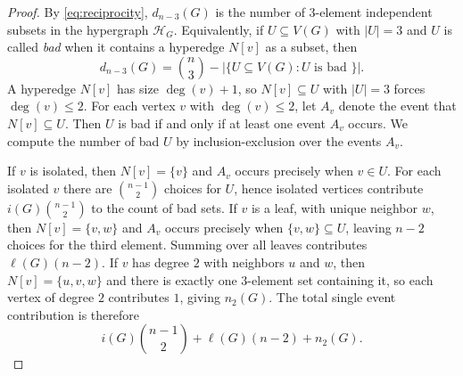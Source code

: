 \documentclass[11pt]{amsart}
\numberwithin{equation}{section}
\newcommand{\VV}{V(G)}
\newcommand{\HH}{\mathcal{H}}
\begin{document}
\begin{proof}
By \eqref{eq:reciprocity}, $d_{n-3}(G)$ is the number of $3$-element independent subsets in the hypergraph $\HH_G$. Equivalently, if $U\subseteq\VV$ with $|U|=3$ and $U$ is called \emph{bad} when it contains a hyperedge $N[v]$ as a subset, then
\[
d_{n-3}(G)=\binom{n}{3}-|\{U\subseteq\VV: U \text{ is bad }\}|.
\]
A hyperedge $N[v]$ has size $\deg(v)+1$, so $N[v]\subseteq U$ with $|U|=3$ forces $\deg(v)\le 2$. For each vertex $v$ with $\deg(v)\le 2$, let $A_v$ denote the event that $N[v]\subseteq U$. Then $U$ is bad if and only if at least one event $A_v$ occurs. We compute the number of bad $U$ by inclusion-exclusion over the events $A_v$.

If $v$ is isolated, then $N[v]=\{v\}$ and $A_v$ occurs precisely when $v\in U$. For each isolated $v$ there are $\binom{n-1}{2}$ choices for $U$, hence isolated vertices contribute $i(G)\binom{n-1}{2}$ to the count of bad sets. If $v$ is a leaf, with unique neighbor $w$, then $N[v]=\{v,w\}$ and $A_v$ occurs precisely when $\{v,w\}\subseteq U$, leaving $n-2$ choices for the third element. Summing over all leaves contributes $\ell(G)(n-2)$. If $v$ has degree $2$ with neighbors $u$ and $w$, then $N[v]=\{u,v,w\}$ and there is exactly one $3$-element set containing it, so each vertex of degree $2$ contributes $1$, giving $n_2(G)$. The total single event contribution is therefore
\[
i(G)\binom{n-1}{2}+\ell(G)(n-2)+n_2(G).
\]


\end{proof}
\end{document}
